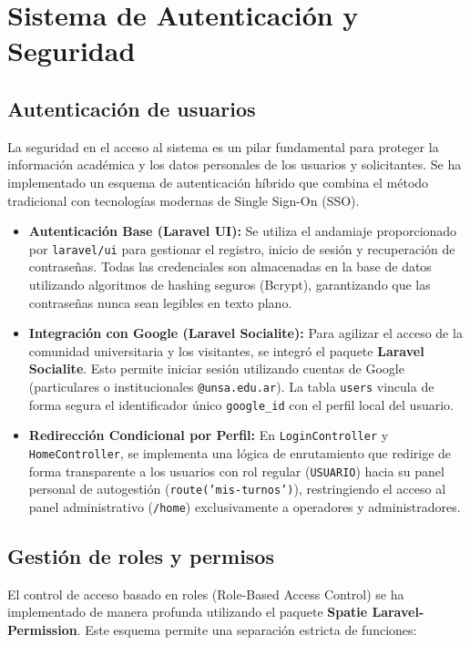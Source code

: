 \chapter{Sistema de Autenticación y Seguridad}

\section{Autenticación de usuarios}
La seguridad en el acceso al sistema es un pilar fundamental para proteger la información académica y los datos personales de los usuarios y solicitantes. Se ha implementado un esquema de autenticación híbrido que combina el método tradicional con tecnologías modernas de Single Sign-On (SSO).

\begin{itemize}
    \item \textbf{Autenticación Base (Laravel UI):} Se utiliza el andamiaje proporcionado por \texttt{laravel/ui} para gestionar el registro, inicio de sesión y recuperación de contraseñas. Todas las credenciales son almacenadas en la base de datos utilizando algoritmos de hashing seguros (Bcrypt), garantizando que las contraseñas nunca sean legibles en texto plano.
    \item \textbf{Integración con Google (Laravel Socialite):} Para agilizar el acceso de la comunidad universitaria y los visitantes, se integró el paquete \textbf{Laravel Socialite}. Esto permite iniciar sesión utilizando cuentas de Google (particulares o institucionales \texttt{@unsa.edu.ar}). La tabla \texttt{users} vincula de forma segura el identificador único \texttt{google\_id} con el perfil local del usuario.
    \item \textbf{Redirección Condicional por Perfil:} En \texttt{LoginController} y \texttt{HomeController}, se implementa una lógica de enrutamiento que redirige de forma transparente a los usuarios con rol regular (\texttt{USUARIO}) hacia su panel personal de autogestión (\texttt{route('mis-turnos')}), restringiendo el acceso al panel administrativo (\texttt{/home}) exclusivamente a operadores y administradores.
\end{itemize}

\section{Gestión de roles y permisos}
El control de acceso basado en roles (Role-Based Access Control) se ha implementado de manera profunda utilizando el paquete \textbf{Spatie Laravel-Permission}. Este esquema permite una separación estricta de funciones:

